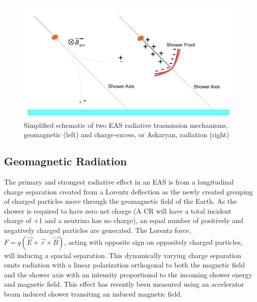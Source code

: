 \begin{figure}
	\centering
	\includegraphics[width=\textwidth]{figures/EASRadiation}
	\caption{Simplified schematic of two EAS radiative trasmission mechanisms, geomagnetic (left) and charge-excess, or Askaryan, radiation (right)}
	\label{fig:EASRadiation}
\end{figure}

	
	\subsection{Geomagnetic Radiation}
		The primary and strongest radiative effect in an EAS is from a longitudinal charge separation created from a Lorentz deflection as the newly created grouping of charged particles move through the geomagnetic field of the Earth.  As the shower is required to have zero net charge (A CR will have a total incident charge of +1 and a neutrino has no charge), an equal number of positively and negatively charged particles are generated.  The Lorentz force, $F=q(\vec{E}+\vec{v}\times\vec{B})$, acting with opposite sign on oppositely charged particles, will inducing a spacial separation.  This dynamically varying charge separation emits radiation with a linear polarization orthogonal to both the magnetic field and the shower axis with an intensity proportional to the incoming shower energy and magnetic field.  This effect has recently been measured using an accelerator beam induced shower transiting an induced magnetic field.\cite{SLACT510}
	
